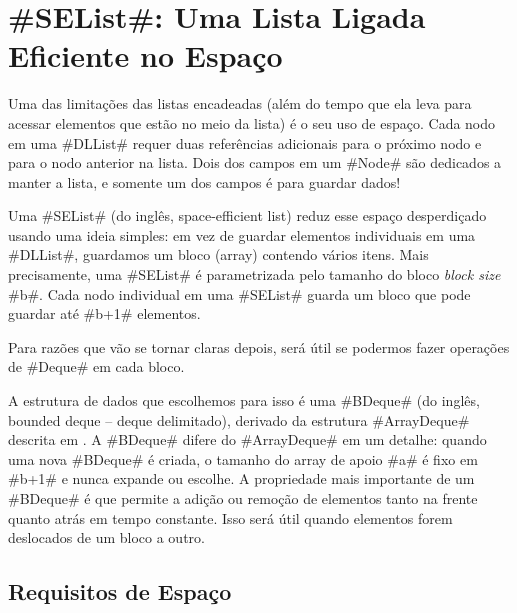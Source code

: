 \section{#SEList#: Uma Lista Ligada Eficiente no Espaço}
%
%
Uma das limitações das listas encadeadas (além do tempo que ela leva para
acessar elementos que estão no meio da lista) é o seu uso de espaço.
Cada nodo em uma #DLList# requer duas referências adicionais para o próximo nodo e para o nodo anterior na lista. Dois dos campos em um #Node# são dedicados a manter a lista, e somente um dos campos é para guardar dados!

Uma #SEList# (do inglês, space-efficient list) reduz esse espaço desperdiçado usando uma ideia simples: 
em vez de guardar elementos individuais em uma #DLList#,
guardamos um bloco (array) contendo vários itens.
Mais precisamente, uma 
#SEList# é parametrizada pelo tamanho do bloco \emph{block size} #b#.
Cada nodo individual em uma #SEList# guarda um bloco que pode guardar até #b+1# elementos.

Para razões que vão se tornar claras depois, será útil se podermos fazer operações de 
#Deque# em cada bloco.

A estrutura de dados que escolhemos para isso é uma 
#BDeque# (do inglês, bounded deque -- deque delimitado),
%
%
%
%
derivado da estrutura #ArrayDeque#
descrita em . A #BDeque# difere do #ArrayDeque#
em um detalhe: quando uma nova #BDeque# é criada, o tamanho do array de apoio #a#
é fixo em #b+1# e nunca expande ou escolhe.
A propriedade mais importante de um #BDeque# é que permite a adição ou remoção
de elementos tanto na frente quanto atrás em tempo constante.
Isso será útil quando elementos forem deslocados de um bloco a outro.




\subsection{Requisitos de Espaço}

